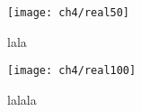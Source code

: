 \begin{figure}
	\centering
	\texttt{[image: ch4/real50]}
	\caption{lala}
	\label{ch4:fig_real50}
\end{figure}

\begin{figure}
	\centering
	\texttt{[image: ch4/real100]}
	\caption{lalala}
	\label{ch4:fig_real100}
\end{figure}





























